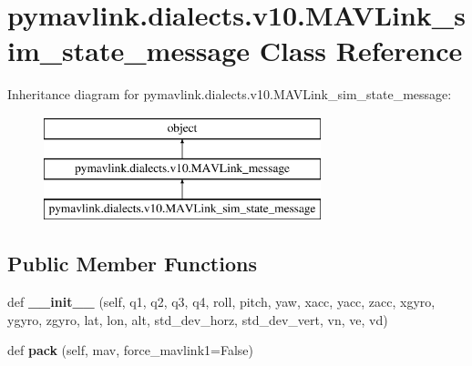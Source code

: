 \hypertarget{classpymavlink_1_1dialects_1_1v10_1_1MAVLink__sim__state__message}{}\section{pymavlink.\+dialects.\+v10.\+M\+A\+V\+Link\+\_\+sim\+\_\+state\+\_\+message Class Reference}
\label{classpymavlink_1_1dialects_1_1v10_1_1MAVLink__sim__state__message}
Inheritance diagram for pymavlink.\+dialects.\+v10.\+M\+A\+V\+Link\+\_\+sim\+\_\+state\+\_\+message\+:\begin{figure}[H]
\begin{center}
\leavevmode
\includegraphics[height=3.000000cm]{classpymavlink_1_1dialects_1_1v10_1_1MAVLink__sim__state__message}
\end{center}
\end{figure}
\subsection*{Public Member Functions}
\begin{DoxyCompactItemize}
\item 
\mbox{\label{classpymavlink_1_1dialects_1_1v10_1_1MAVLink__sim__state__message_ab2346614197c5a45f8886fee19eb9fcf}} 
def {\bfseries \+\_\+\+\_\+init\+\_\+\+\_\+} (self, q1, q2, q3, q4, roll, pitch, yaw, xacc, yacc, zacc, xgyro, ygyro, zgyro, lat, lon, alt, std\+\_\+dev\+\_\+horz, std\+\_\+dev\+\_\+vert, vn, ve, vd)
\item 
\mbox{\label{classpymavlink_1_1dialects_1_1v10_1_1MAVLink__sim__state__message_abd5e728c6e9dbeccf294341b8d1852fb}} 
def {\bfseries pack} (self, mav, force\+\_\+mavlink1=False)
\end{DoxyCompactItemize}
